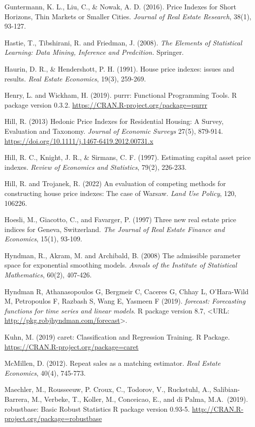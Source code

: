 \documentclass[
]{article}
\begin{document}
Guntermann, K. L., Liu, C., \& Nowak, A. D. (2016). Price Indexes for
Short Horizons, Thin Markets or Smaller Cities. \emph{Journal of Real
Estate Research}, 38(1), 93-127.

Hastie, T., Tibshirani, R. and Friedman, J. (2008). \emph{The Elements
of Statistical Learning: Data Mining, Inference and Predcition.}
Springer.

Haurin, D. R., \& Hendershott, P. H. (1991). House price indexes: issues
and results. \emph{Real Estate Economics}, 19(3), 259-269.

Henry, L. and Wickham, H. (2019). purrr: Functional Programming Tools. R
package version 0.3.2. \url{https://CRAN.R-project.org/package=purrr}

Hill, R. (2013) Hedonic Price Indexes for Residential Housing: A Survey,
Evaluation and Taxonomy. \emph{Journal of Economic Surveys} 27(5),
879-914. \url{https://doi.org/10.1111/j.1467-6419.2012.00731.x}

Hill, R. C., Knight, J. R., \& Sirmans, C. F. (1997). Estimating capital
asset price indexes. \emph{Review of Economics and Statistics}, 79(2),
226-233.

Hill, R. and Trojanek, R. (2022) An evaluation of competing methods for
constructing house price indexes: The case of Warsaw. \emph{Land Use
Policy}, 120, 106226.

Hoesli, M., Giacotto, C., and Favarger, P. (1997) Three new real estate
price indices for Geneva, Switzerland. \emph{The Journal of Real Estate
Finance and Economics}, 15(1), 93-109.

Hyndman, R., Akram, M. and Archibald, B. (2008) The admissible parameter
space for exponential smoothing models. \emph{Annals of the Institute of
Statistical Mathematics}, 60(2), 407-426.

Hyndman R, Athanasopoulos G, Bergmeir C, Caceres G, Chhay L, O'Hara-Wild
M, Petropoulos F, Razbash S, Wang E, Yasmeen F (2019). \emph{forecast:
Forecasting functions for time series and linear models}. R package
version 8.7, \textless URL:
\url{http://pkg.robjhyndman.com/forecast}\textgreater.

Kuhn, M. (2019) caret: Classification and Regression Training. R
Package. \url{https://CRAN.R-project.org/package=caret}

McMillen, D. (2012). Repeat sales as a matching estimator. \emph{Real
Estate Economics}, 40(4), 745-773.

Maechler, M., Rousseeuw, P. Croux, C., Todorov, V., Ruckstuhl, A.,
Salibian-Barrera, M., Verbeke, T., Koller, M., Conceicao, E., and di
Palma, M.A.~(2019). robustbase: Basic Robust Statistics R package
version 0.93-5. \url{http://CRAN.R-project.org/package=robustbase}
\end{document}
